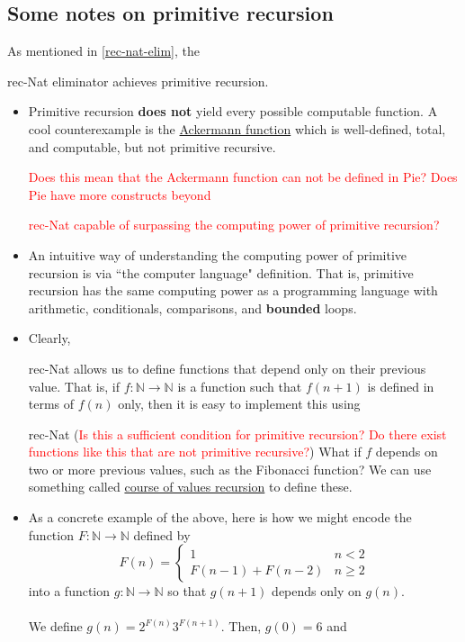\documentclass{article}
\newcommand{\bb}[1]{\mathbb{#1}}
\newcommand{\bN}{\bb{N}}
\newcommand*{\SavedLstInline}{}
\DeclareRobustCommand*{\lstinline}{%
  \ifmmode
    \let\SavedBGroup\bgroup
    \def\bgroup{%
      \let\bgroup\SavedBGroup
      \hbox\bgroup
    }%
  \fi
  \SavedLstInline
}
\begin{document}
\subsection{Some notes on primitive recursion}
As mentioned in \autoref{rec-nat-elim}, the \lstinline{rec-Nat} eliminator achieves primitive recursion.
\begin{itemize}
    \item 
        Primitive recursion \textbf{does not} yield every possible computable function. A cool counterexample is the \href{https://en.wikipedia.org/wiki/Ackermann_function}{Ackermann function} which is well-defined, total, and computable, but not primitive recursive. \textcolor{red}{Does this mean that the Ackermann function can not be defined in Pie? Does Pie have more constructs beyond \lstinline{rec-Nat} capable of surpassing the computing power of primitive recursion?}
    \item
        An intuitive way of understanding the computing power of primitive recursion is via ``the computer language" definition. That is, primitive recursion has the same computing power as a programming language with arithmetic, conditionals, comparisons, and \textbf{bounded} loops.
    \item
        Clearly, \lstinline{rec-Nat} allows us to define functions that depend only on their previous value. That is, if \(f : \mathbb{N} \to \mathbb{N}\) is a function such that \(f(n + 1)\) is defined in terms of \(f(n)\) only, then it is easy to implement this using \lstinline{rec-Nat} (\textcolor{red}{Is this a sufficient condition for primitive recursion? Do there exist functions like this that are not primitive recursive?}) What if \(f\) depends on two or more previous values, such as the Fibonacci function? We can use something called \href{https://en.wikipedia.org/wiki/Course-of-values_recursion}{course of values recursion} to define these.
    \item
        As a concrete example of the above, here is how we might encode the function \(F : \bN \to \bN\) defined by \[
            F(n) = \begin{cases}
                        1 & n < 2 \\
                        F(n - 1) + F(n - 2) & n \geq 2
                   \end{cases}
        \]
        into a function \(g : \bN \to \bN\) so that \(g(n + 1)\) depends only on \(g(n)\). 
        \\ \\
        We define \(g(n) = 2^{F(n)}3^{F(n + 1)}\). Then, \(g(0) = 6\) and \begin{align*}

\end{align*}
\end{itemize}
\end{document}

